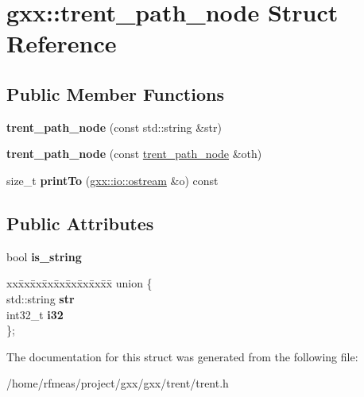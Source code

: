 \hypertarget{structgxx_1_1trent__path__node}{}\section{gxx\+:\+:trent\+\_\+path\+\_\+node Struct Reference}
\label{structgxx_1_1trent__path__node}
\subsection*{Public Member Functions}
\begin{DoxyCompactItemize}
\item 
{\bfseries trent\+\_\+path\+\_\+node} (const std\+::string \&str)\hypertarget{structgxx_1_1trent__path__node_a33e712682652b9f1b1996636b5ec4f27}{}\label{structgxx_1_1trent__path__node_a33e712682652b9f1b1996636b5ec4f27}

\item 
{\bfseries trent\+\_\+path\+\_\+node} (const \hyperlink{structgxx_1_1trent__path__node}{trent\+\_\+path\+\_\+node} \&oth)\hypertarget{structgxx_1_1trent__path__node_a03db840f4609002d6e78cb03a668895a}{}\label{structgxx_1_1trent__path__node_a03db840f4609002d6e78cb03a668895a}

\item 
size\+\_\+t {\bfseries print\+To} (\hyperlink{classgxx_1_1io_1_1ostream}{gxx\+::io\+::ostream} \&o) const \hypertarget{structgxx_1_1trent__path__node_a41b33b4631beffd76a71c55a9b651542}{}\label{structgxx_1_1trent__path__node_a41b33b4631beffd76a71c55a9b651542}

\end{DoxyCompactItemize}
\subsection*{Public Attributes}
\begin{DoxyCompactItemize}
\item 
bool {\bfseries is\+\_\+string}\hypertarget{structgxx_1_1trent__path__node_a4cfc59881fc4b015f1f363e20d02726f}{}\label{structgxx_1_1trent__path__node_a4cfc59881fc4b015f1f363e20d02726f}

\item 
\begin{tabbing}
xx\=xx\=xx\=xx\=xx\=xx\=xx\=xx\=xx\=\kill
union \{\\
\>std::string {\bfseries str}\\
\>int32\_t {\bfseries i32}\\
\}; \hypertarget{structgxx_1_1trent__path__node_ab2d58ba8856bd9cfd0af95c6ed22e6ba}{}\label{structgxx_1_1trent__path__node_ab2d58ba8856bd9cfd0af95c6ed22e6ba}
\\

\end{tabbing}\end{DoxyCompactItemize}


The documentation for this struct was generated from the following file\+:\begin{DoxyCompactItemize}
\item 
/home/rfmeas/project/gxx/gxx/trent/trent.\+h\end{DoxyCompactItemize}
